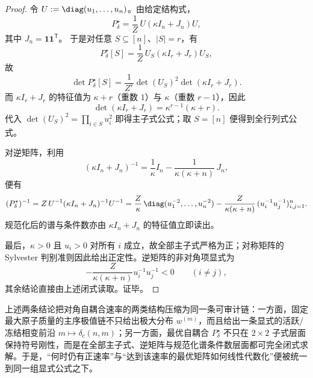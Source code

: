 \begin{proof}
令 \(U:=\diag(u_1,\dots,u_n)\)。由给定结构式，
\[
P_\delta^\star
=
\frac{1}{Z}\,U(\kappa I_n+J_n)U,
\]
其中 \(J_n=\mathbf 1\mathbf 1^{\mathsf T}\)。
于是对任意 \(S\subseteq[n]\)、\(|S|=r\)，有
\[
P_\delta^\star[S]=\frac{1}{Z}\,U_S(\kappa I_r+J_r)U_S,
\]
故
\[
\det P_\delta^\star[S]
=
\frac{1}{Z^r}\det(U_S)^2\det(\kappa I_r+J_r).
\]
而 \(\kappa I_r+J_r\) 的特征值为 \(\kappa+r\)（重数 \(1\)）与 \(\kappa\)（重数 \(r-1\)），因此
\[
\det(\kappa I_r+J_r)=\kappa^{r-1}(\kappa+r).
\]
代入 \(\det(U_S)^2=\prod_{i\in S}u_i^2\) 即得主子式公式；取 \(S=[n]\) 便得到全行列式公式。

对逆矩阵，利用
\[
(\kappa I_n+J_n)^{-1}
=
\frac1\kappa I_n-\frac{1}{\kappa(\kappa+n)}\,J_n,
\]
便有
\[
(P_\delta^\star)^{-1}
=
Z\,U^{-1}(\kappa I_n+J_n)^{-1}U^{-1}
=
\frac{Z}{\kappa}\,\diag(u_1^{-2},\dots,u_n^{-2})
-\frac{Z}{\kappa(\kappa+n)}\,(u_i^{-1}u_j^{-1})_{i,j=1}^n.
\]
规范化后的谱与条件数亦由 \(\kappa I_n+J_n\) 的特征值立即读出。

最后，\(\kappa>0\) 且 \(u_i>0\) 对所有 \(i\) 成立，故全部主子式严格为正；对称矩阵的 Sylvester 判别准则因此给出正定性。逆矩阵的非对角项显式为
\[
-\frac{Z}{\kappa(\kappa+n)}u_i^{-1}u_j^{-1}<0
\qquad(i\ne j),
\]
其余结论直接由上述闭式读取。证毕。
\end{proof}

上述两条结论把对角自耦合速率的两类结构压缩为同一条可审计链：一方面，固定最大原子质量的主序极值链不只给出极大分布 \(w^{(m)}\)，而且给出一条显式的活跃/冻结相变前沿 \(m\mapsto\delta_c(n,m)\)；另一方面，最优自耦合 \(P_\delta^\star\) 不只在 \(2\times2\) 子式层面保持符号刚性，而是在全部主子式、逆矩阵与规范化谱条件数层面都可完全闭式求解。于是，“何时仍有正速率”与“达到该速率的最优矩阵如何线性代数化”便被统一到同一组显式公式之下。

\endinput
